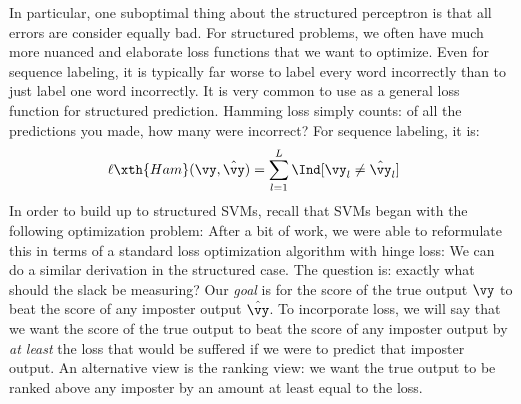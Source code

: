 In particular, one suboptimal thing about the structured perceptron is that all errors are consider equally bad.
For structured problems, we often have much more nuanced and elaborate loss functions that we want to optimize.
Even for sequence labeling, it is typically far worse to label every word incorrectly than to just label one word incorrectly.
It is very common to use  as a general loss function for structured prediction.
Hamming loss simply counts: of all the predictions you made, how many were incorrect?
For sequence labeling, it is:
\begin{align}
\ell\xth{Ham}(\vy, \hat\vy) &= \sum_{l=1}^L \Ind[ \vy_l \neq \hat \vy_l ]
\end{align}
In order to build up to structured SVMs, recall that  SVMs began with the following optimization problem:
%
%
After a bit of work, we were able to reformulate this in terms of a standard loss optimization algorithm with hinge loss:
%
%
We can do a similar derivation in the structured case.
The question is: exactly what should the slack be measuring?
Our \emph{goal} is for the score of the true output $\vy$ to beat the score of any imposter output $\hat\vy$.
To incorporate loss, we will say that we want the score of the true output to beat the score of any imposter output by \emph{at least} the loss that would be suffered if we were to predict that imposter output.
An alternative view is the ranking view: we want the true output to be ranked above any imposter by an amount at least equal to the loss.

